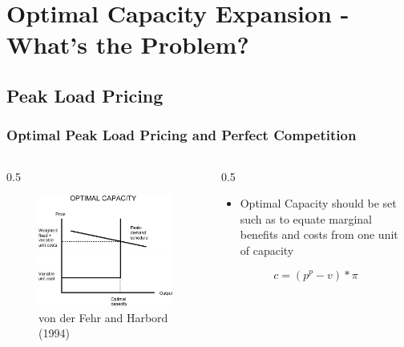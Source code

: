 \section{Optimal Capacity Expansion - What's the Problem?}

\subsection{Peak Load Pricing}

\begin{frame}
					
\frametitle{Optimal Peak Load Pricing and Perfect Competition}
\begin{columns}
\begin{column} {0.5\textwidth}

\begin{figure}[h]
\centering
\includegraphics[width=1.\textwidth]{capacity/peak_load_opt}
    \caption{von der Fehr and Harbord (1994)}
    \label{fig:Daten 2004}            
\end{figure}
\end{column}

\begin{column} {0.5\textwidth}
\begin{itemize}
\item Optimal Capacity should be set such as to equate marginal benefits and costs from one unit of capacity
\end{itemize}

\begin{equation}
	c=(p^p-v)*\pi
\end{equation}


\end{column}
\end{columns}
\end{frame}
